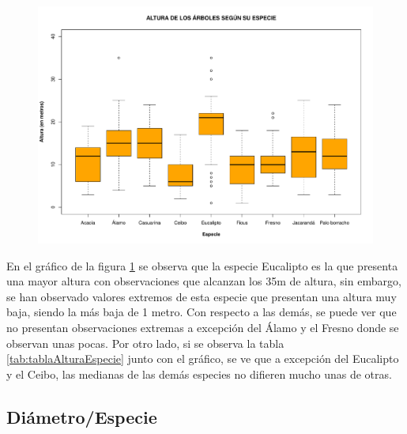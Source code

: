 \documentclass[11pt]{article}
\begin{document}
\begin{figure}[h!]
  \begin{center}
    \includegraphics[width=0.9\linewidth]{boxAlturaEspecie.pdf}
    \caption{}
    \label{fig:boxAlturaEspecie}
  \end{center}
\end{figure}

\begin{justify}
  En el gráfico de la figura \ref{fig:boxAlturaEspecie} se observa
  que la especie Eucalipto es la que presenta una mayor altura con observaciones
  que alcanzan los 35m de altura, sin embargo, se han observado valores extremos
  de esta especie que presentan una altura muy baja, siendo la más baja de 1 metro.
  Con respecto a las demás, se puede ver que no presentan observaciones extremas
  a excepción del Álamo y el Fresno donde se observan unas pocas.
  Por otro lado, si se observa la tabla \ref{tab:tablaAlturaEspecie} junto con el
  gráfico, se ve que a excepción del Eucalipto y el Ceibo, las medianas de las
  demás especies no difieren mucho unas de otras.
\end{justify}


\subsection{Diámetro/Especie}
\end{document}
